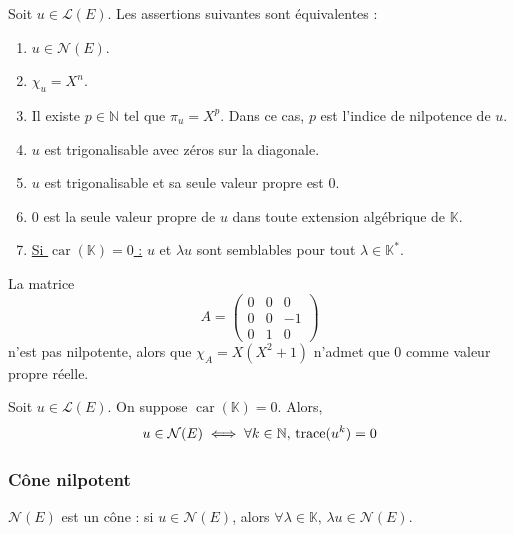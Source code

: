   \begin{theorem}
    \label{156-1}
    Soit $u \in \mathcal{L}(E)$. Les assertions suivantes sont équivalentes :
    \begin{enumerate}[label={\bfseries(\roman*)}]
      \item $u \in \mathcal{N}(E)$.
      \item $\chi_u = X^n$.
      \item Il existe $p \in \mathbb{N}$ tel que $\pi_u = X^p$. Dans ce cas, $p$ est l'indice de nilpotence de $u$.
      \item $u$ est trigonalisable avec zéros sur la diagonale.
      \item $u$ est trigonalisable et sa seule valeur propre est $0$.
      \item $0$ est la seule valeur propre de $u$ dans toute extension algébrique de $\mathbb{K}$.
      \item \uline{Si $\operatorname{car}(\mathbb{K}) = 0$ :} $u$ et $\lambda u$ sont semblables pour tout $\lambda \in \mathbb{K}^*$.
    \end{enumerate}
  \end{theorem}

  \begin{cexample}
    La matrice
    \[
      A = \begin{pmatrix}
        0 & 0 & 0 \\
        0 & 0 & -1 \\
        0 & 1 & 0
      \end{pmatrix}
    \]
    n'est pas nilpotente, alors que $\chi_A = X(X^2 + 1)$ n'admet que $0$ comme valeur propre réelle.
  \end{cexample}

  \begin{proposition}
    Soit $u \in \mathcal{L}(E)$. On suppose $\operatorname{car}(\mathbb{K}) = 0$. Alors,
    \[ u \in \mathcal{N}(E) \iff \forall k \in \mathbb{N}, \, \operatorname{trace}(u^k) = 0 \]
  \end{proposition}

  \subsubsection{Cône nilpotent}

  \begin{proposition}
    $\mathcal{N}(E)$ est un cône : si $u \in \mathcal{N}(E)$, alors $\forall \lambda \in \mathbb{K}, \, \lambda u \in \mathcal{N}(E)$.
  \end{proposition}

